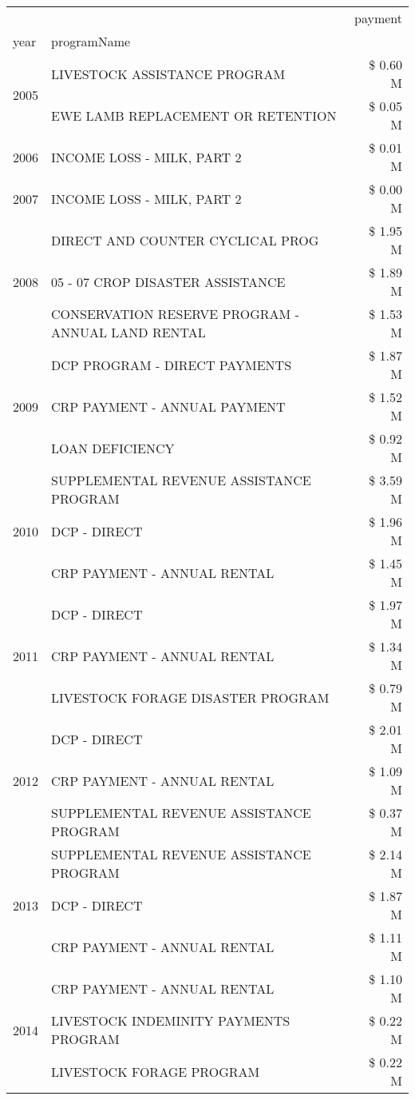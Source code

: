 \begin{tabular}{llr}
\toprule
 &  & payment \\
year & programName &  \\
\midrule
\multirow[t]{2}{*}{2005} & LIVESTOCK ASSISTANCE PROGRAM & \$ 0.60 M \\
 & EWE LAMB REPLACEMENT OR RETENTION & \$ 0.05 M \\
\cline{1-3}
2006 & INCOME LOSS - MILK, PART 2 & \$ 0.01 M \\
\cline{1-3}
2007 & INCOME LOSS - MILK, PART 2 & \$ 0.00 M \\
\cline{1-3}
\multirow[t]{3}{*}{2008} & DIRECT AND COUNTER CYCLICAL PROG & \$ 1.95 M \\
 & 05 - 07 CROP DISASTER ASSISTANCE & \$ 1.89 M \\
 & CONSERVATION RESERVE PROGRAM - ANNUAL LAND RENTAL & \$ 1.53 M \\
\cline{1-3}
\multirow[t]{3}{*}{2009} & DCP PROGRAM - DIRECT PAYMENTS & \$ 1.87 M \\
 & CRP PAYMENT - ANNUAL PAYMENT & \$ 1.52 M \\
 & LOAN DEFICIENCY & \$ 0.92 M \\
\cline{1-3}
\multirow[t]{3}{*}{2010} & SUPPLEMENTAL REVENUE ASSISTANCE PROGRAM & \$ 3.59 M \\
 & DCP - DIRECT & \$ 1.96 M \\
 & CRP PAYMENT - ANNUAL RENTAL & \$ 1.45 M \\
\cline{1-3}
\multirow[t]{3}{*}{2011} & DCP - DIRECT & \$ 1.97 M \\
 & CRP PAYMENT - ANNUAL RENTAL & \$ 1.34 M \\
 & LIVESTOCK FORAGE DISASTER PROGRAM & \$ 0.79 M \\
\cline{1-3}
\multirow[t]{3}{*}{2012} & DCP - DIRECT & \$ 2.01 M \\
 & CRP PAYMENT - ANNUAL RENTAL & \$ 1.09 M \\
 & SUPPLEMENTAL REVENUE ASSISTANCE PROGRAM & \$ 0.37 M \\
\cline{1-3}
\multirow[t]{3}{*}{2013} & SUPPLEMENTAL REVENUE ASSISTANCE PROGRAM & \$ 2.14 M \\
 & DCP - DIRECT & \$ 1.87 M \\
 & CRP PAYMENT - ANNUAL RENTAL & \$ 1.11 M \\
\cline{1-3}
\multirow[t]{3}{*}{2014} & CRP PAYMENT - ANNUAL RENTAL & \$ 1.10 M \\
 & LIVESTOCK INDEMINITY PAYMENTS PROGRAM & \$ 0.22 M \\
 & LIVESTOCK FORAGE PROGRAM & \$ 0.22 M \\

\end{tabular}
